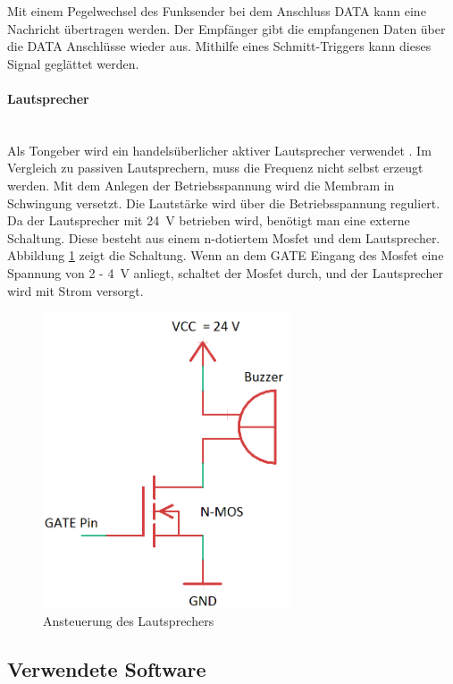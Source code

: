 Mit einem Pegelwechsel des Funksender bei dem Anschluss \si{DATA} kann eine Nachricht übertragen werden. Der Empfänger gibt die empfangenen Daten über die \si{DATA} Anschlüsse wieder aus. Mithilfe eines Schmitt-Triggers kann dieses Signal geglättet werden.

\paragraph{Lautsprecher}\mbox{}\\
Als Tongeber wird ein handelsüberlicher aktiver Lautsprecher verwendet \cite{src_LAUTSPRECHER}. Im Vergleich zu passiven Lautsprechern, muss die Frequenz nicht selbst erzeugt werden. Mit dem Anlegen der Betriebsspannung wird die Membram in Schwingung versetzt. Die Lautstärke wird über die Betriebsspannung reguliert. Da der Lautsprecher mit \SI{24}{\volt} betrieben wird, benötigt man eine externe Schaltung. Diese besteht aus einem n-dotiertem Mosfet und dem Lautsprecher. Abbildung \ref{img:schaltung} zeigt die Schaltung. Wenn an dem \si{GATE} Eingang des Mosfet eine Spannung von \si{2} - \SI{4}{\volt} anliegt, schaltet der Mosfet durch, und der Lautsprecher wird mit Strom versorgt. 
\begin{figure}[H]
        \centering
	\hspace*{-1.5cm}
        \includegraphics[width=0.65\textwidth]{images/schaltung.png}
        \caption{Ansteuerung des Lautsprechers}
        \label{img:schaltung}
\end{figure}


\subsection{Verwendete Software}
